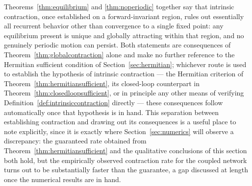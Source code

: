 \documentclass[preprint,12pt,authoryear]{elsarticle}
\begin{document}
Theorems~\ref{thm:equilibrium} and \ref{thm:noperiodic} together say that intrinsic contraction, once established on a forward-invariant region, rules out essentially all recurrent behavior other than convergence to a single fixed point: any equilibrium present is unique and globally attracting within that region, and no genuinely periodic motion can persist. Both statements are consequences of Theorem~\ref{thm:globalcontraction} alone and make no further reference to the Hermitian sufficient condition of Section~\ref{sec:hermitian}; whichever route is used to establish the hypothesis of intrinsic contraction — the Hermitian criterion of Theorem~\ref{thm:hermitiansufficient}, its closed-loop counterpart in Theorem~\ref{thm:closedloopsufficient}, or in principle any other means of verifying Definition~\ref{def:intrinsiccontraction} directly — these consequences follow automatically once that hypothesis is in hand. This separation between establishing contraction and drawing out its consequences is a useful place to note explicitly, since it is exactly where Section~\ref{sec:numerics} will observe a discrepancy: the guaranteed rate obtained from Theorem~\ref{thm:hermitiansufficient} and the qualitative conclusions of this section both hold, but the empirically observed contraction rate for the coupled network turns out to be substantially faster than the guarantee, a gap discussed at length once the numerical results are in hand.
\end{document}
